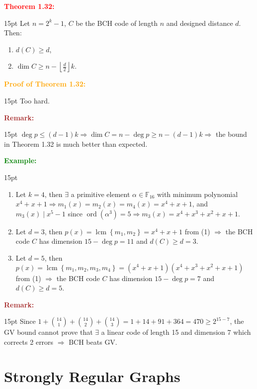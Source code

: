 \documentclass[12pt]{article}
\newcommand{\noparskip}{\vspace{-\parskip}}
\newenvironment{points}
	{\begin{enumerate}[label = (\arabic*)]}
	{\end{enumerate}}
\newenvironment{dent}
	{\begin{adjustwidth}{15pt}{}\noparskip}
	{\end{adjustwidth}}
\newenvironment{result}[1]
	{\textcolor{Red}{\textbf{#1:}}\begin{dent}}
	{\end{dent}}
\newenvironment{proof}[1]
	{\textcolor{Orange}{\textbf{Proof of #1:}}\begin{dent}}
	{\end{dent}}
\newenvironment{example}
	{\textcolor{Green}{\textbf{Example:}}\begin{dent}}
	{\end{dent}}
\newenvironment{remark}
	{\textcolor{Brown}{\textbf{Remark:}}\begin{dent}}
	{\end{dent}}
\renewcommand{\implies}{\Rightarrow}
\newcommand{\set}[1]{\left\{ #1 \right\}}
\newcommand{\field}[1]{\mathbb{F}_{#1}}
\newcommand{\ord}[1]{\operatorname{ord}(#1)}
\newcommand{\lcm}[1]{\operatorname{lcm}\set{#1}}
\newcommand{\floor}[1]{\left\lfloor #1 \right\rfloor}
\begin{document}
\begin{result}{Theorem 1.32}
Let $n = 2^k - 1$, $C$ be the BCH code of length $n$ and designed distance $d$. Then:
\noparskip
\begin{points}
\item $d(C) \ge d$,
\item $\dim C \ge n - \floor{\frac{d}{2}}k$.
\end{points}
\end{result}

\begin{proof}{Theorem 1.32}
Too hard.
\end{proof}

\begin{remark}
$\deg p \le (d - 1)k \implies \dim C = n - \deg p \ge n - (d - 1)k \implies$ the bound in Theorem 1.32 is much better than expected.
\end{remark}

\begin{example}
\begin{points}
\item Let $k = 4$, then $\exists$ a primitive element $\alpha \in \field{16}$ with minimum polynomial $x^4 + x + 1 \implies m_1(x) = m_2(x) = m_4(x) = x^4 + x + 1$, and $m_3(x) \mid x^5 - 1$ since $\ord{\alpha^3} = 5 \implies m_3(x) = x^4 + x^3 + x^2 + x + 1$.
\item Let $d = 3$, then $p(x) = \lcm{m_1, m_2} = x^4 + x + 1$ from (1) $\implies$ the BCH code $C$ has dimension $15 - \deg p = 11$ and $d(C) \ge d = 3$.
\item Let $d = 5$, then $p(x) = \lcm{m_1, m_2, m_3, m_4} = (x^4 + x + 1)(x^4 + x^3 + x^2 + x + 1)$ from (1) $\implies$ the BCH code $C$ has dimension $15 - \deg p = 7$ and $d(C) \ge d = 5$.
\end{points}
\end{example}

\begin{remark}
Since $1 + \binom{14}{1} + \binom{14}{2} + \binom{14}{3} = 1 + 14 + 91 + 364 = 470 \ge 2^{15 - 7}$, the GV bound cannot prove that $\exists$ a linear code of length 15 and dimension 7 which corrects 2 errors $\implies$ BCH beats GV.
\end{remark}

\pagebreak

\section{Strongly Regular Graphs}
\end{document}
